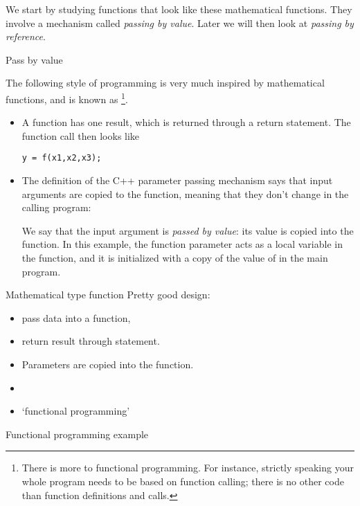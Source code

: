 We start by studying functions that look like these mathematical
functions. They involve a  mechanism
called
\emph{passing by value}.
%
Later we will then look at
\emph{passing by reference}.

 {Pass by value}

The following style of programming is very much inspired by
mathematical functions, and is known as \footnote {There is more to functional programming. For
  instance, strictly speaking your whole program needs to be based on
  function calling; there is no other code than function definitions
  and calls.}.
\begin{itemize}
\item A function has one result, which is returned through a return
  statement. The function call then looks like
\begin{verbatim}
y = f(x1,x2,x3);
\end{verbatim}
\item The definition of the C++ parameter passing mechanism says that
  input arguments are copied to the function, meaning that they don't
  change in the calling program:

  We say that the input argument is
  \emph{passed by value}: its value is
  copied into the function.
  In this example, the function parameter  acts as a local
  variable in the function, and it is initialized with a copy of the
  value of  in the main program.
\end{itemize}

\begin{slide}{Mathematical type function}
  \label{sl:func-functional}
  Pretty good design:
  \begin{itemize}
  \item pass data into a function,
  \item return result through  statement.
  \item Parameters are copied into the function.
  \item {}
  \item `functional programming'
  \end{itemize}
\end{slide}
\begin{slide}{Functional programming example}
  \label{sl:func-functional-ex}
\end{slide}

